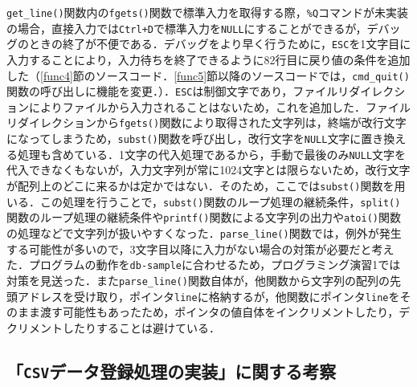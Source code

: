 \verb|get_line()|関数内の\verb|fgets()|関数で標準入力を取得する際，\verb|%Q|コマンドが未実装の場合，直接入力では\verb|Ctrl+D|で標準入力を\verb|NULL|にすることができるが，デバッグのときの終了が不便である．デバッグをより早く行うために，\verb|ESC|を1文字目に入力することにより，入力待ちを終了できるように82行目に戻り値の条件を追加した（\ref{func4}節のソースコード．\ref{func5}節以降のソースコードでは，\verb|cmd_quit()|関数の呼び出しに機能を変更．）．\verb|ESC|は制御文字であり，ファイルリダイレクションによりファイルから入力されることはないため，これを追加した\cite{www:label2}．ファイルリダイレクションから\verb|fgets()|関数により取得された文字列は，終端が改行文字になってしまうため，\verb|subst()|関数を呼び出し，改行文字を\verb|NULL|文字に置き換える処理も含めている．1文字の代入処理であるから，手動で最後のみ\verb|NULL|文字を代入できなくもないが，入力文字列が常に1024文字とは限らないため，改行文字が配列上のどこに来るかは定かではない．そのため，ここでは\verb|subst()|関数を用いる．この処理を行うことで，\verb|subst()|関数のループ処理の継続条件，\verb|split()|関数のループ処理の継続条件や\verb|printf()|関数による文字列の出力や\verb|atoi()|関数の処理などで文字列が扱いやすくなった．\verb|parse_line()|関数では，例外が発生する可能性が多いので，3文字目以降に入力がない場合の対策が必要だと考えた．プログラムの動作を\verb|db-sample|に合わせるため，プログラミング演習1では対策を見送った．また\verb|parse_line()|関数自体が，他関数から文字列の配列の先頭アドレスを受け取り，ポインタ\verb|line|に格納するが，他関数にポインタ\verb|line|をそのまま渡す可能性もあったため，ポインタの値自体をインクリメントしたり，デクリメントしたりすることは避けている．

\subsection{「\texttt{CSV}データ登録処理の実装」に関する考察}

